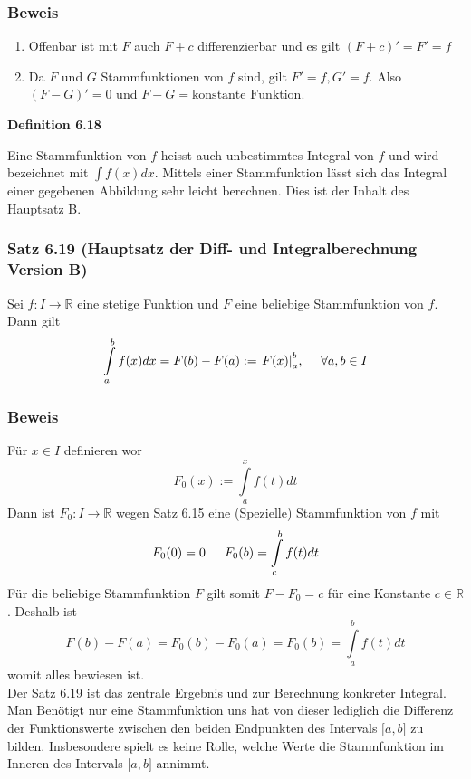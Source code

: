 \subsubsection*{Beweis}
\begin{enumerate}[\indent (a)]
\item Offenbar ist mit $F$ auch $F+c$ differenzierbar und es gilt $(F+c)'=F'=f$
\item Da $F$ und $G$ Stammfunktionen von $f$ sind, gilt $F'=f, G'=f$. Also $(F-G)'=0$ und $F-G=\text{konstante Funktion}$. 
\end{enumerate}

\begin{framed}
\centerline{\textbf{Definition 6.18}}
\noindent Eine Stammfunktion von $f$ heisst auch unbestimmtes Integral von $f$ und wird bezeichnet mit $\int {f(x)dx} $. Mittels einer Stammfunktion lässt sich das Integral einer gegebenen Abbildung sehr leicht berechnen. Dies ist der Inhalt des Hauptsatz B.\\
\end{framed}
\subsubsection*{Satz 6.19 (Hauptsatz der Diff- und Integralberechnung Version B)}
Sei $f:I\rightarrow\mathbb{R}$ eine stetige Funktion und $F$ eine beliebige Stammfunktion von $f$. Dann gilt \[\int\limits_a^b {f(x)dx = F(b) - F(a): = \left. {F(x)} \right|_a^b}\text{,\indent}\forall a,b\in I \]

\subsubsection*{Beweis}
Für $x\in I$ definieren wor $$F_0(x):=\int\limits_a^x {f(t)dt} $$
Dann ist $F_0:I\rightarrow\mathbb{R}$ wegen Satz 6.15 eine (Spezielle) Stammfunktion von $f$ mit \[{F_0}(0) = 0\text{\indent}{F_0}(b) = \int\limits_c^b {f(t)dt} \]
Für die beliebige Stammfunktion $F$ gilt somit $F-F_0=c$ für eine Konstante $c\in\mathbb{R}$. Deshalb ist \[F(b) - F(a) = {F_0}(b) - {F_0}(a) = {F_0}(b) = \int\limits_a^b {f(t)dt} \] womit alles bewiesen ist. \\

Der Satz 6.19 ist das zentrale Ergebnis und zur Berechnung konkreter Integral. Man Benötigt nur eine Stammfunktion uns hat von dieser lediglich die Differenz der Funktionswerte zwischen den beiden Endpunkten des Intervals $\lbrack a,b\rbrack$ zu bilden. 
Insbesondere spielt es keine Rolle, welche Werte die Stammfunktion im Inneren des Intervals  $\lbrack a,b\rbrack$ annimmt.
